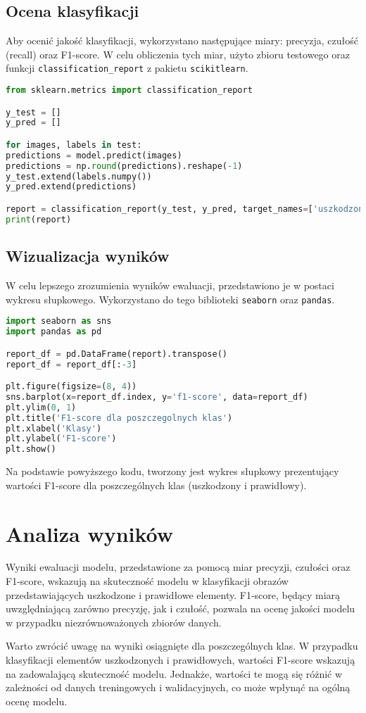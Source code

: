 \subsection{Ocena klasyfikacji}
Aby ocenić jakość klasyfikacji, wykorzystano następujące miary: precyzja, czułość (recall) oraz F1-score. W celu obliczenia tych miar, użyto zbioru testowego oraz funkcji \texttt{classification\_report} z pakietu \texttt{scikit\-learn}.

\begin{lstlisting}[language=Python]
from sklearn.metrics import classification_report

y_test = []
y_pred = []

for images, labels in test:
predictions = model.predict(images)
predictions = np.round(predictions).reshape(-1)
y_test.extend(labels.numpy())
y_pred.extend(predictions)

report = classification_report(y_test, y_pred, target_names=['uszkodzony', 'prawidlowy'], output_dict=True)
print(report)
\end{lstlisting}

\subsection{Wizualizacja wyników}
W celu lepszego zrozumienia wyników ewaluacji, przedstawiono je w postaci wykresu słupkowego. Wykorzystano do tego biblioteki \texttt{seaborn} oraz \texttt{pandas}.

\begin{lstlisting}[language=Python]
import seaborn as sns
import pandas as pd

report_df = pd.DataFrame(report).transpose()
report_df = report_df[:-3]

plt.figure(figsize=(8, 4))
sns.barplot(x=report_df.index, y='f1-score', data=report_df)
plt.ylim(0, 1)
plt.title('F1-score dla poszczegolnych klas')
plt.xlabel('Klasy')
plt.ylabel('F1-score')
plt.show()
\end{lstlisting}

Na podstawie powyższego kodu, tworzony jest wykres słupkowy prezentujący wartości F1-score dla poszczególnych klas (uszkodzony i prawidłowy).

\section{Analiza wyników}
Wyniki ewaluacji modelu, przedstawione za pomocą miar precyzji, czułości oraz F1-score, wskazują na skuteczność modelu w klasyfikacji obrazów przedstawiających uszkodzone i prawidłowe elementy. F1-score, będący miarą uwzględniającą zarówno precyzję, jak i czułość, pozwala na ocenę jakości modelu w przypadku niezrównoważonych zbiorów danych.

Warto zwrócić uwagę na wyniki osiągnięte dla poszczególnych klas. W przypadku klasyfikacji elementów uszkodzonych i prawidłowych, wartości F1-score wskazują na zadowalającą skuteczność modelu. Jednakże, wartości te mogą się różnić w zależności od danych treningowych i walidacyjnych, co może wpłynąć na ogólną ocenę modelu.
